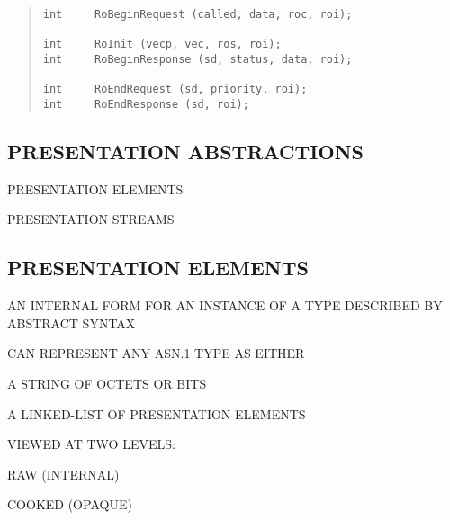 \begin{bwslide}

\begin{quote}\small\begin{verbatim}
int     RoBeginRequest (called, data, roc, roi);

int     RoInit (vecp, vec, ros, roi);
int     RoBeginResponse (sd, status, data, roi);

int     RoEndRequest (sd, priority, roi);
int     RoEndResponse (sd, roi);
\end{verbatim}\end{quote}
\end{bwslide}


\begin{bwslide}
\part	{PRESENTATION ABSTRACTIONS}\bf

\begin{nrtc}
\item	PRESENTATION ELEMENTS

\item	PRESENTATION STREAMS
\end{nrtc}
\end{bwslide}


\begin{bwslide}
\part*	{PRESENTATION ELEMENTS}\bf

\begin{nrtc}
\item	AN INTERNAL FORM FOR AN INSTANCE OF A TYPE DESCRIBED BY ABSTRACT
	SYNTAX

\item	CAN REPRESENT ANY ASN.1 TYPE AS EITHER
    \begin{nrtc}
    \item	A STRING OF OCTETS OR BITS

    \item	A LINKED-LIST OF PRESENTATION ELEMENTS
    \end{nrtc}

\item	VIEWED AT TWO LEVELS:
    \begin{nrtc}
    \item	RAW (INTERNAL)

    \item	COOKED (OPAQUE)
    \end{nrtc}
\end{nrtc}
\end{bwslide}



